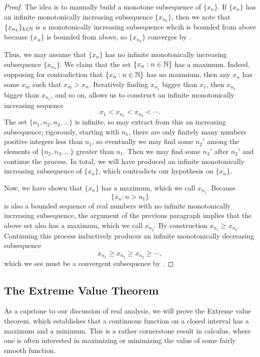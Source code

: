\documentclass[../notes.tex]{subfiles}
\begin{document}
\begin{proof}
    The idea is to manually build a monotone subsequence of $\{x_n\}$. If $\{x_n\}$ has an infinite monotonically increasing subsequence $\{x_{n_k}\}$, then we note that $\{x_{n_k}\}_{k\in\mathbb N}$ is a monotonically increasing subsequence whcih is bounded from above because $\{x_n\}$ is bounded from above, so $\{x_{n_k}\}$ converges by .

    Thus, we may assume that $\{x_n\}$ has no infinite monotonically increasing subsequence $\{x_{n_k}\}$. We claim that the set $\{x_n:n\in\mathbb N\}$ has a maximum. Indeed, supposing for contradiction that $\{x_n:n\in\mathbb N\}$ has no maxmium, then any $x_n$ has some $x_m$ such that $x_m>x_n$. Iteratively finding $x_{n_1}$ bigger than $x_1$, then $x_{n_2}$ bigger than $x_{n_1}$, and so on, allows us to construct an infinite monotonically increasing sequence
    \[x_1<x_{n_1}<x_{n_2}<\cdots.\]
    The set $\{n_1,n_2,n_3,\ldots\}$ is infinite, so may extract from this an increasing subsequence; rigorously, starting with $n_1$, there are only finitely many numbers positive integers less than $n_1$, so eventually we may find some $n_2'$ among the elements of $\{n_2,n_3,\ldots\}$ greater than $n_1$. Then we may find some $n_3'$ after $n_2'$ and continue the process. In total, we will have produced an infinite monotonically increasing subsequence of $\{x_n\}$, which contradicts our hypothesis on $\{x_n\}$.

    Now, we have shown that $\{x_n\}$ has a maximum, which we call $x_{n_1}$. Because
    \[\{x_n:n>n_1\}\]
    is also a bounded sequence of real numbers with no infinite monotonically increasing subsequence, the argument of the previous paragraph implies that the above set also has a maximum, which we call $x_{n_2}$. By construction $x_{n_1}\ge x_{n_2}$. Continuing this process inductively produces an infinite monotonically decreasing subsequence
    \[x_{n_1}\ge x_{n_2}\ge x_{n_3}\ge\cdots,\]
    which we see must be a convergent subsequence by .
\end{proof}

\subsection{The Extreme Value Theorem}
As a capstone to our discussion of real analysis, we will prove the Extreme value theorem, which establishes that a continuous function on a closed interval has a maximum and a minimum. This is a rather cornerstone result in calculus, where one is often interested in maximizing or minimizing the value of some fairly smooth function.
\end{document}
